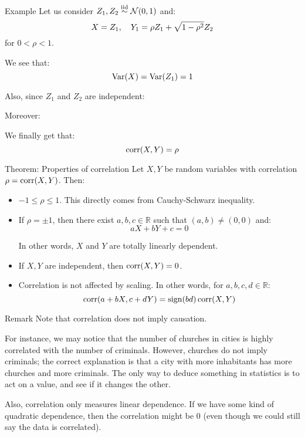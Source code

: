 \documentclass[a4paper]{article}
\begin{document}
\begin{parag}{Example}
    Let us consider $Z_1, Z_2 \iid \mathcal{N}\left(0, 1\right)$ and: 
    \[X = Z_1, \quad Y_1 = \rho Z_1 + \sqrt{1 - \rho^2} Z_2\]
    for $0 < \rho < 1$.
    
    We see that: 
    \[\Var\left(X\right) = \Var\left(Z_1\right) = 1\]
    
    Also, since $Z_1$ and $Z_2$ are independent: 
    
    Moreover: 
    
    We finally get that: 
    \[\corr\left(X, Y\right) = \rho\]
\end{parag}

\begin{parag}{Theorem: Properties of correlation}
    Let $X, Y$ be random variables with correlation $\rho = \corr\left(X, Y\right)$. Then:
    \begin{itemize}
        \item $-1 \leq \rho \leq 1$. This directly comes from Cauchy-Schwarz inequality.
        \item If $\rho = \pm1$, then there exist $a, b, c \in \mathbb{R}$ such that $\left(a, b\right) \neq \left(0, 0\right)$ and:
        \[aX + bY + c = 0\]

        In other words, $X$ and $Y$ are totally linearly dependent.
        \item If $X, Y$ are independent, then $\corr\left(X, Y\right) = 0$.
        \item Correlation is not affected by scaling. In other words, for $a, b, c, d \in \mathbb{R}$: 
        \[\corr\left(a + bX, c + dY\right) = \sign\left(bd\right)\corr\left(X, Y\right)\]
    \end{itemize}
\end{parag}


\begin{parag}{Remark}
    Note that correlation does not imply causation. 

    For instance, we may notice that the number of churches in cities is highly correlated with the number of criminals. However, churches do not imply criminals; the correct explanation is that a city with more inhabitants has more churches and more criminals. The only way to deduce something in statistics is to act on a value, and see if it changes the other.

    Also, correlation only measures linear dependence. If we have some kind of quadratic dependence, then the correlation might be 0 (even though we could still say the data is correlated).
\end{parag}
\end{document}
